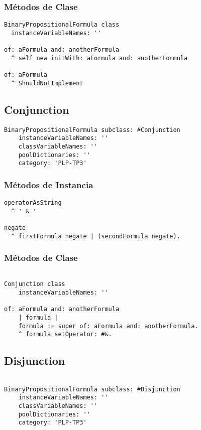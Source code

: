 \documentclass[spanish, 10pt,a4paper]{article}
\numberwithin{equation}{section} %
\begin{document}
\subsubsection{Métodos de Clase}
\begin{lstlisting}
BinaryPropositionalFormula class
  instanceVariableNames: ''

of: aFormula and: anotherFormula
  ^ self new initWith: aFormula and: anotherFormula

of: aFormula
  ^ ShouldNotImplement 

\end{lstlisting}

\subsection{Conjunction}

\begin{lstlisting}
BinaryPropositionalFormula subclass: #Conjunction
	instanceVariableNames: ''
	classVariableNames: ''
	poolDictionaries: ''
	category: 'PLP-TP3'
\end{lstlisting}

\subsubsection{Métodos de Instancia}
\begin{lstlisting}
operatorAsString
  ^ ' & '

negate
  ^ firstFormula negate | (secondFormula negate).

\end{lstlisting}

\subsubsection{Métodos de Clase}

\begin{lstlisting}

Conjunction class
	instanceVariableNames: ''

of: aFormula and: anotherFormula
	| formula |
	formula := super of: aFormula and: anotherFormula.
	^ formula setOperator: #&.
\end{lstlisting}

\subsection{Disjunction}

\begin{lstlisting}

BinaryPropositionalFormula subclass: #Disjunction
	instanceVariableNames: ''
	classVariableNames: ''
	poolDictionaries: ''
	category: 'PLP-TP3'
\end{lstlisting}
\end{document}
